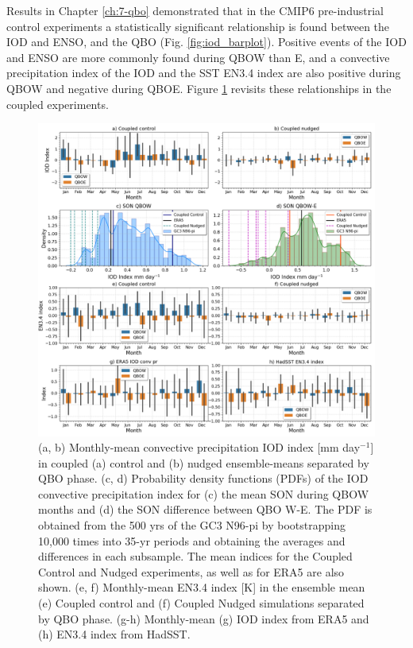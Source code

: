 
Results in Chapter \ref{ch:7-qbo} demonstrated that in the CMIP6 pre-industrial control experiments a statistically significant relationship is found between the IOD and ENSO, and the QBO (Fig. \ref{fig:iod_barplot}). 
Positive events of the IOD and ENSO are more commonly found during QBOW than E, and a convective precipitation index of the IOD and the SST EN3.4 index are also positive during QBOW and negative during QBOE. 
Figure \ref{fig:iod_suites} revisits these relationships in the coupled experiments. 

\begin{figure}[t!]
\centering
 \includegraphics[width=\linewidth]{figures/iod_suites.png}
\caption[IOD and ENSO indices in nudged versus control experiments]{(a, b) Monthly-mean convective precipitation IOD index [mm day$^{-1}$] in coupled (a) control and (b) nudged ensemble-means separated by QBO phase. (c, d) Probability density functions (PDFs) of the IOD convective precipitation index for (c) the mean SON during QBOW months and (d) the SON difference between QBO W-E. The PDF is obtained from the 500 yrs of the GC3 N96-pi by bootstrapping 10,000 times into 35-yr periods and obtaining the averages and differences in each subsample. The mean indices for the Coupled Control and Nudged experiments, as well as for ERA5 are also shown. (e, f) Monthly-mean EN3.4 index [K] in the ensemble mean (e) Coupled control and (f) Coupled Nudged simulations separated by QBO phase. (g-h) Monthly-mean (g) IOD index from ERA5 and (h) EN3.4 index from HadSST.  }
\label{fig:iod_suites}
\end{figure}

